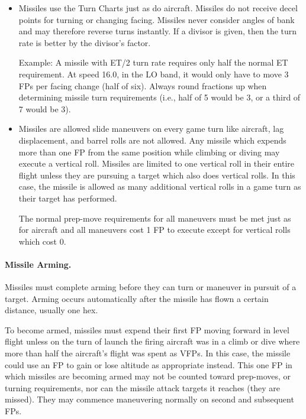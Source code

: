 \begin{itemize}
\begin{itemize}
    \end{itemize}

    \item {} Missiles use the Turn Charts just as do aircraft. Missiles do not receive decel points for turning or changing facing. Missiles never consider angles of bank and may therefore reverse turns instantly. If a divisor is given, then the turn rate is better by the divisor's factor.

    Example: A missile with ET/2 turn rate requires only half the normal ET requirement. At speed 16.0, in the LO band, it would only have to move 3 FPs per facing change (half of six). Always round fractions up when determining missile turn requirements (i.e., half of 5 would be 3, or a third of 7 would be 3).

    \item {} Missiles are allowed slide maneuvers on every game turn like aircraft, lag displacement, and barrel rolls are not allowed. Any missile which expends more than one FP from the same position while climbing or diving may execute a vertical roll. Missiles are limited to one vertical roll in their entire flight unless they are pursuing a target which also does vertical rolls. In this case, the missile is allowed as many additional vertical rolls in a game turn as their target has performed.

    The normal prep-move requirements for all maneuvers must be met just as for aircraft and all maneuvers cost 1 FP to execute except for vertical rolls which cost 0. 

\end{itemize}

\paragraph{Missile Arming.} Missiles must complete arming before they can turn or maneuver in pursuit of a target. Arming occurs automatically after the missile has flown a certain distance, usually one hex.

To become armed, missiles must expend their first FP moving forward in level flight unless on the turn of launch the firing aircraft was in a climb or dive where more than half the aircraft's flight was spent as VFPs. In this case, the missile could use an FP to gain or lose altitude as appropriate instead. This one FP in which missiles are becoming armed may not be counted toward prep-moves, or turning requirements, nor can the missile attack targets it reaches (they are missed). They may commence maneuvering normally on second and subsequent FPs. 

